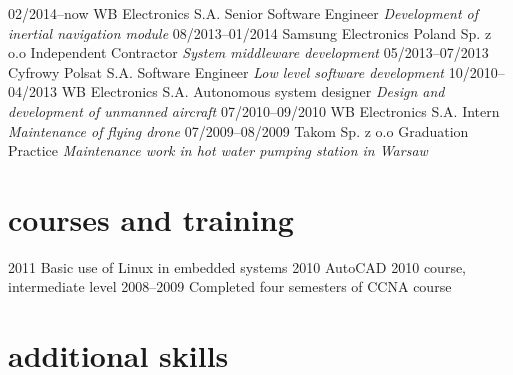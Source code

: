 \documentclass[]{friggeri-cv}
\begin{document}
\begin{entrylist}
  \entry
    {02/2014–now}
    {WB Electronics S.A.}
    {Senior Software Engineer}
    {\emph{Development of inertial navigation module}}
  \entry
    {08/2013–01/2014}
    {Samsung Electronics Poland Sp. z o.o}
    {Independent Contractor}
    {\emph{System middleware development}}
  \entry
    {05/2013–07/2013}
    {Cyfrowy Polsat S.A.}
    {Software Engineer}
    {\emph{Low level software development}}
  \entry
    {10/2010–04/2013}
    {WB Electronics S.A.}
    {Autonomous system designer}
    {\emph{Design and development of unmanned aircraft}}
  \entry
    {07/2010–09/2010}
    {WB Electronics S.A.}
    {Intern}
    {\emph{Maintenance of flying drone}}
  \entry
    {07/2009–08/2009}
    {Takom Sp. z o.o}
    {Graduation Practice}
    {\emph{Maintenance work in hot water pumping station in Warsaw}}
\end{entrylist}

\section{courses and training}

\begin{entrylist}
  \entry
    {2011}
    {Basic use of Linux in embedded systems}
    {}
    {}
  \entry
    {2010}
    {AutoCAD 2010 course, intermediate level}
    {}
    {}
  \entry
    {2008–2009}
    {Completed four semesters of CCNA course}
    {}
    {}
\end{entrylist}

\section{additional skills}
\end{document}
